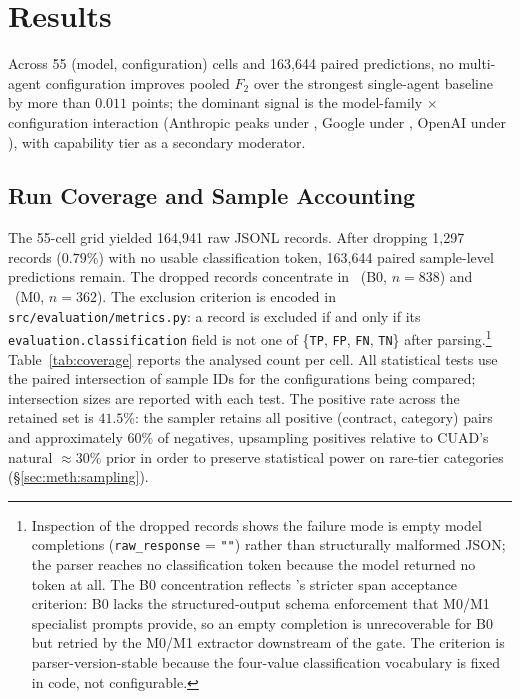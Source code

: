 
\chapter{Results}\label{chapter:results}

Across 55 (model, configuration) cells and 163{,}644 paired predictions, no multi-agent configuration improves pooled $F_2$ over the strongest single-agent baseline by more than $0.011$ points; the dominant signal is the model-family $\times$ configuration interaction (Anthropic peaks under \cfgCoT, Google under \cfgZS, OpenAI under \cfgCX), with capability tier as a secondary moderator.

\section{Run Coverage and Sample Accounting}\label{sec:res:overview}

The 55-cell grid yielded 164{,}941 raw JSONL records. After dropping 1{,}297
records ($0.79\%$) with no usable classification token, 163{,}644 paired
sample-level predictions remain. The dropped records concentrate in
\cfgZS\ (B0, $n{=}838$) and \cfgCX\ (M0, $n{=}362$). The exclusion criterion is encoded in
\texttt{src/evaluation/metrics.py}: a record is excluded if and only if its
\texttt{evaluation.classification} field is not one of \{\texttt{TP},
\texttt{FP}, \texttt{FN}, \texttt{TN}\} after parsing.\footnote{Inspection of
the dropped records shows the failure mode is empty model completions
(\texttt{raw\_response} = \texttt{""}) rather than structurally malformed
JSON; the parser reaches no classification token because the model returned
no token at all. The B0 concentration reflects \cfgZS's stricter span
acceptance criterion: B0 lacks the structured-output schema enforcement that
M0/M1 specialist prompts provide, so an empty completion is unrecoverable
for B0 but retried by the M0/M1 extractor downstream of the gate. The
criterion is parser-version-stable because the four-value classification
vocabulary is fixed in code, not configurable.} Table~\ref{tab:coverage} reports the analysed count per cell. All
statistical tests use the paired intersection of sample IDs for the
configurations being compared; intersection sizes are reported with each test.
The positive rate across the retained set is $41.5\%$: the sampler retains
all positive (contract, category) pairs and approximately $60\%$ of negatives,
upsampling positives relative to CUAD's natural $\approx\!30\%$ prior in order
to preserve statistical power on rare-tier categories
(\S\ref{sec:meth:sampling}).

